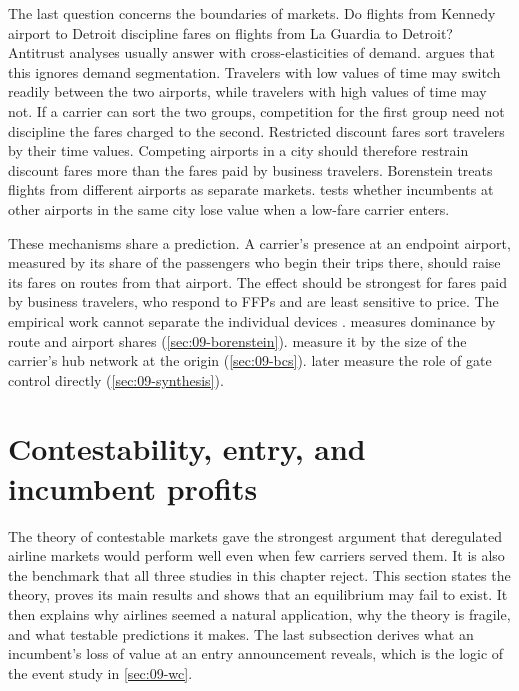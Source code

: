 The last question concerns the boundaries of markets. Do flights from Kennedy airport to Detroit discipline
fares on flights from La Guardia to Detroit? Antitrust analyses usually answer with cross-elasticities of
demand. \citet[p.~348]{Borenstein1989} argues that this ignores demand segmentation. Travelers with low values
of time may switch readily between the two airports, while travelers with high values of time may not. If a
carrier can sort the two groups, competition for the first group need not discipline the fares charged to the
second. Restricted discount fares sort travelers by their time values. Competing airports in a city should
therefore restrain discount fares more than the fares paid by business travelers. Borenstein treats flights
from different airports as separate markets.  tests whether incumbents at other airports in
the same city lose value when a low-fare carrier enters.

These mechanisms share a prediction. A carrier's presence at an endpoint airport, measured by its share of the
passengers who begin their trips there, should raise its fares on routes from that airport. The effect should
be strongest for fares paid by business travelers, who respond to FFPs and are least sensitive to price. The
empirical work cannot separate the individual devices \citep[p.~362]{Borenstein1989}. \citet{Borenstein1989}
measures dominance by route and airport shares (\cref{sec:09-borenstein}).
\citet{BerryCarnallSpiller2006} measure it by the size of the carrier's hub network at the origin
(\cref{sec:09-bcs}). \citet{CilibertoWilliams2010} later measure the role of gate control directly
(\cref{sec:09-synthesis}).

\section{Contestability, entry, and incumbent profits}\label{sec:09-contest}

The theory of contestable markets gave the strongest argument that deregulated airline markets would perform
well even when few carriers served them. It is also the benchmark that all three studies in this chapter
reject. This section states the theory, proves its main results and shows that an equilibrium may fail to
exist. It then explains why airlines seemed a natural application, why the theory is fragile, and what
testable predictions it makes. The last subsection
derives what an incumbent's loss of value at an entry announcement reveals, which is the logic of the event
study in \cref{sec:09-wc}.

